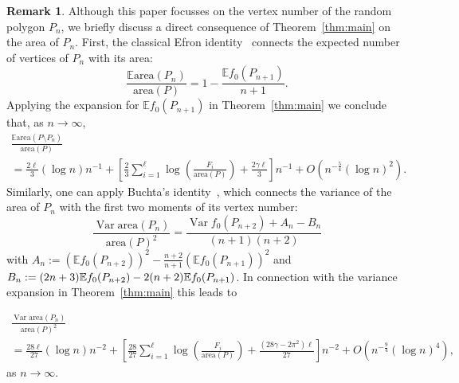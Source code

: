 \documentclass[10pt]{amsart}
\theoremstyle{definition}\newtheorem{defi}[theo]{Definition}\newtheorem{rema}[theo]{Remark}\newtheorem{exam}[theo]{Example}\newtheorem{exem}[theo]{Example}\newtheorem{nota}[theo]{Notation}
\newcommand{\var}{\operatorname{Var}}
\newcommand{\bbE}{\mathbb{E}}
\newcommand{\area}{\mathrm{area}}
\begin{document}
\begin{rema}
Although this paper focusses on the vertex number of the random polygon $P_n$, we briefly discuss a direct consequence of Theorem~\ref{thm:main} on the area of $P_n$. First, the classical Efron identity~\cite{Ef} connects the expected number of vertices of $P_n$ with its area:
\[
\frac{\bbE{\area}(P_n)}{{\area}(P)} = 1- \frac{\bbE f_0(P_{n+1})}{n+1}.
\]
Applying the expansion for $\bbE f_0(P_{n+1})$ in Theorem~\ref{thm:main} we conclude that, as $n\to\infty$,
\begin{multline*}
\frac{\bbE {\area}(P \setminus P_n)}{{\area}(P)} \\
= \frac{2 \ell}{3} (\log n)n^{-1}+ \left[\frac {2}3 \sum_{i=1}^\ell \log \left(\frac{F_i}{{\area}(P)}\right) + \frac{2 \gamma \ell }3 \right] n^{-1} + O\left(n^{-\frac 54} (\log n)^2\right).
\end{multline*}
Similarly, one can apply Buchta's identity~\cite[Corollary~1]{Bu11}, which connects the variance of the area of $P_n$ with the first two moments of its vertex number:
\[
\frac{\var{\area}(P_n)}{{\area}(P)^2} = \frac{\var f_0(P_{n+2})+A_n-B_n}{(n+1)(n+2)}
\]
with $A_n:=(\bbE f_0(P_{n+2}))^2-\frac{n+2}{n+1}(\bbE f_0(P_{n+1}))^2$ and $B_n:=(2n+3)\bbE f_0(P_{n+2})-2(n+2)\linebreak \bbE f_0(P_{n+1})$. In connection with the variance expansion in Theorem~\ref{thm:main} this leads to

\begin{multline*}
\frac {\var {\area}(P_n)}{{\area}(P)^2} \\ 
= \frac{28 \ell}{27} (\log n)n^{-2} +\left[\frac{28}{27}\sum_{i=1}^\ell \log \left(\frac{F_i}{{\area}(P)}\right) +
\frac{(28 \gamma -2 \pi^2)\ell }{27}\right]n^{-2}
 + O\left(n^{-\frac 94}(\log n)^4\right),
\end{multline*}
as $n\to\infty$.
\end{rema}
\end{document}
